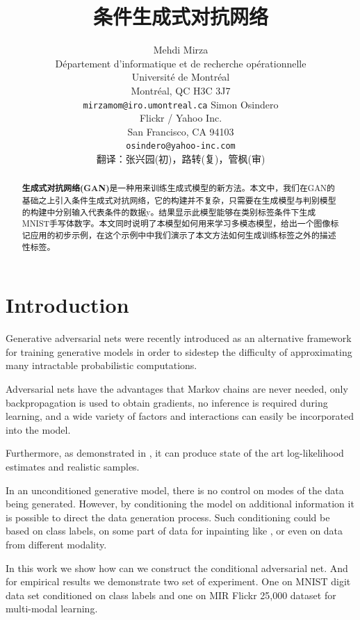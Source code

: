 \documentclass{article} %
\title{条件生成式对抗网络}
\author{
Mehdi Mirza \\
D\'epartement d'informatique et de recherche op\'erationnelle\\
Universit\'e de Montr\'eal\\
Montr\'eal, QC H3C 3J7 \\
\texttt{mirzamom@iro.umontreal.ca}
\AND
Simon Osindero \\
Flickr / Yahoo Inc. \\
San Francisco, CA 94103 \\
\texttt{osindero@yahoo-inc.com} \\
翻译：张兴园(初)，路转(复)，管枫(审)\\
}
\begin{document}
\maketitle

\begin{abstract}
\textbf{生成式对抗网络(GAN)}\cite{Goodfellow-et-al-NIPS2014-small}是一种用来训练生成式模型的新方法。本文中，我们在GAN的基础之上引入条件生成式对抗网络，它的构建并不复杂，只需要在生成模型与判别模型的构建中分别输入代表条件的数据y。结果显示此模型能够在类别标签条件下生成MNIST手写体数字。本文同时说明了本模型如何用来学习多模态模型，给出一个图像标记应用的初步示例，在这个示例中中我们演示了本文方法如何生成训练标签之外的描述性标签。
\end{abstract}

\section{Introduction}

Generative adversarial nets were recently introduced as an alternative framework for training
generative models in order to sidestep the difficulty of approximating many intractable probabilistic
computations.

Adversarial nets have the advantages that Markov chains
are never needed, only backpropagation is used to obtain gradients,
no inference is required during learning,
and a wide variety of factors and interactions can easily be incorporated into the model.

Furthermore, as demonstrated in \cite{Goodfellow-et-al-NIPS2014-small},
it can produce state of the art log-likelihood estimates and realistic samples.

In an unconditioned generative model, there is no control on modes of the data being generated.
However, by conditioning the model on additional information it is possible to direct the data
generation process. Such conditioning could be based on class labels, on some part of data
for inpainting like \cite{goodfellow2013multi}, or even on data from different modality.

In this work we show how can we construct the conditional adversarial net. And for empirical
results we demonstrate two set of experiment. One on MNIST digit data set conditioned on class
labels and one on MIR Flickr 25,000 dataset \cite{huiskes08} for multi-modal learning.
\end{document}
